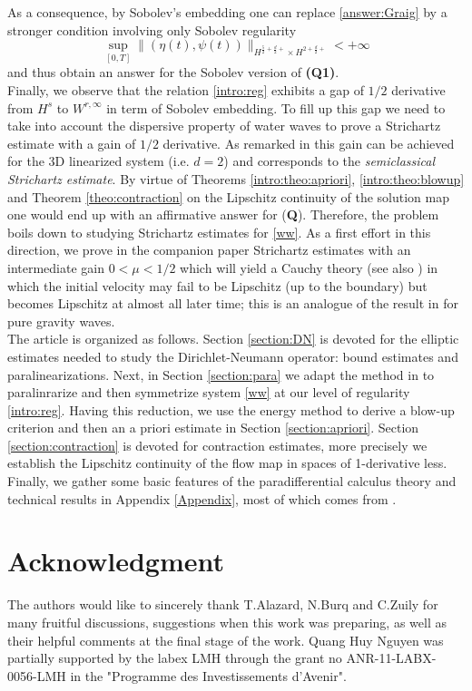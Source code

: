 \documentclass[11pt,english]{smfart}
\theoremstyle{plain}
\theoremstyle{definition}
\numberwithin{equation}{section}
\begin{document}
As a consequence, by Sobolev's embedding one can replace \eqref{answer:Graig} by a stronger condition involving only Sobolev regularity
\[
\sup_{[0, T]}\| (\eta(t), \psi(t))\|_{H^{\frac{5}{2}+\frac{d}{2}+}\times H^{2+\frac{d}{2}+}}<+\infty
\]
and thus obtain an answer for the Sobolev version of {\bf (Q1)}.\\ 
{\hspace*{.15in}}  Finally, we observe that the relation \eqref{intro:reg} exhibits a gap of $1/2$ derivative from $H^s$ to $W^{r,\infty}$ in term of Sobolev embedding. To fill up this gap we need to take into account the dispersive property of water waves to prove a Strichartz estimate with a gain of $1/2$ derivative. As remarked in \cite{NgPo} this gain can be achieved for the 3D linearized system (i.e. $d=2$) and corresponds to the {\it semiclassical Strichartz estimate}.  By virtue of Theorems \ref{intro:theo:apriori},  \ref{intro:theo:blowup} and Theorem \ref{theo:contraction} on the Lipschitz continuity of the solution map one would end up with an affirmative answer for ({\bf Q}). Therefore, the problem boils down to studying Strichartz estimates for \eqref{ww}. As a first effort in this direction, we prove in the companion paper \cite{NgPo} Strichartz estimates with an intermediate gain $0<\mu<1/2$ which will yield a Cauchy theory (see also \cite{NgPo}) in which the initial velocity may fail to be Lipschitz (up to the boundary) but becomes Lipschitz at almost all later time; this is an analogue of the result in \cite{ABZ4} for pure gravity waves.\\
{\hspace*{.15in}} The article is organized as follows. Section \ref{section:DN} is devoted for the elliptic estimates needed to study the Dirichlet-Neumann operator: bound estimates and paralinearizations. Next, in Section \ref{section:para} we adapt the method in \cite{ABZ1} to paralinrarize and then symmetrize system \eqref{ww} at our level of regularity \eqref{intro:reg}. Having this reduction, we use the energy method to derive a blow-up criterion and then an a priori estimate  in Section \ref{section:apriori}. Section \ref{section:contraction} is  devoted for contraction estimates, more precisely we establish the Lipschitz continuity of the flow map in spaces of 1-derivative less. Finally, we gather some basic features of the paradifferential calculus theory and technical results in Appendix \ref{Appendix}, most of which comes from \cite{ABZ3, ABZ4}.
\section*{Acknowledgment}
{\hspace*{.15in}} The authors would like to sincerely thank T.Alazard, N.Burq and C.Zuily for many fruitful discussions, suggestions when this work was preparing, as well as their helpful comments at the final stage of the work. Quang Huy Nguyen was partially supported by the labex LMH through the grant no ANR-11-LABX-0056-LMH in the "Programme des Investissements d'Avenir".
\end{document}
